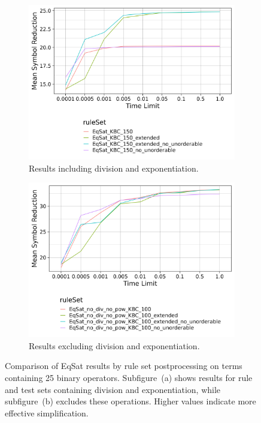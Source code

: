 \begin{figure}[h]
	\centering
	\begin{subfigure}[t]{0.48\textwidth}
		\centering
		\includegraphics[width=\linewidth]{img/by_rule_postprocessing_random_terms_huge.png}
		\caption{Results including division and exponentiation.}
		\label{fig:eqsat_postprocess_with_div}
	\end{subfigure}
	\hfill
	\begin{subfigure}[t]{0.48\textwidth}
		\centering
		\includegraphics[width=\linewidth]{img/by_rule_postprocessing_no_div_no_pow_random_terms_huge.png}
		\caption{Results excluding division and exponentiation.}
		\label{fig:eqsat_postprocess_no_div}
	\end{subfigure}
	\caption{Comparison of EqSat results by rule set postprocessing on terms containing 25 binary operators. 
		Subfigure~(a) shows results for rule and test sets containing division and exponentiation, 
		while subfigure~(b) excludes these operations. Higher values indicate more effective simplification.}
	\label{fig:eqsat_postprocess_comparison}
\end{figure}

